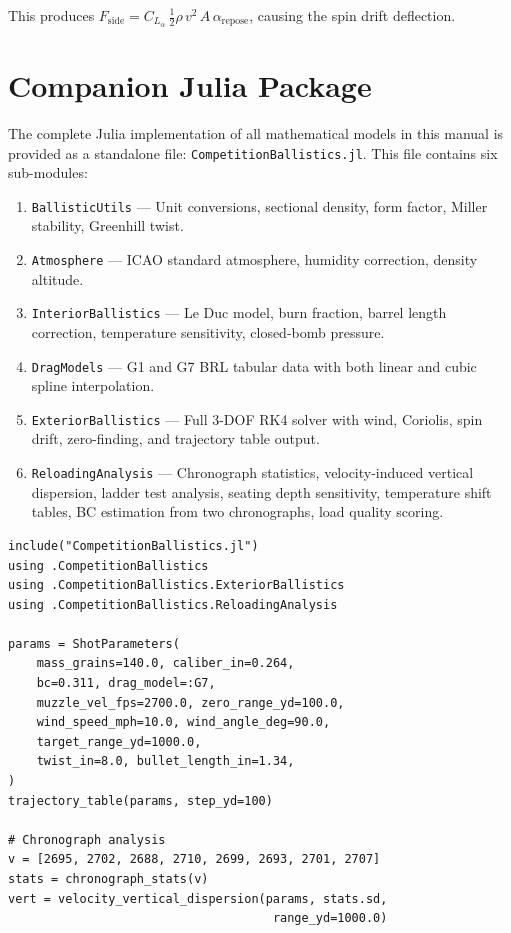\documentclass[11pt,twoside,openright]{report}
\begin{document}
This produces $F_{\mathrm{side}} = C_{L_\alpha}\,\frac{1}{2}\rho\,v^2\,A\,\alpha_{\mathrm{repose}}$, causing the spin drift deflection.


\chapter{Companion Julia Package}
\label{app:julia_file}

The complete Julia implementation of all mathematical models in this manual is provided as a standalone file: \texttt{CompetitionBallistics.jl}. This file contains six sub-modules:

\begin{enumerate}[nosep]
  \item \texttt{BallisticUtils} --- Unit conversions, sectional density, form factor, Miller stability, Greenhill twist.
  \item \texttt{Atmosphere} --- ICAO standard atmosphere, humidity correction, density altitude.
  \item \texttt{InteriorBallistics} --- Le Duc model, burn fraction, barrel length correction, temperature sensitivity, closed-bomb pressure.
  \item \texttt{DragModels} --- G1 and G7 BRL tabular data with both linear and cubic spline interpolation.
  \item \texttt{ExteriorBallistics} --- Full 3-DOF RK4 solver with wind, Coriolis, spin drift, zero-finding, and trajectory table output.
  \item \texttt{ReloadingAnalysis} --- Chronograph statistics, velocity-induced vertical dispersion, ladder test analysis, seating depth sensitivity, temperature shift tables, BC estimation from two chronographs, load quality scoring.
\end{enumerate}

\begin{lstlisting}[caption={Quick-start usage of CompetitionBallistics.jl},label={lst:quickstart}]
include("CompetitionBallistics.jl")
using .CompetitionBallistics
using .CompetitionBallistics.ExteriorBallistics
using .CompetitionBallistics.ReloadingAnalysis

params = ShotParameters(
    mass_grains=140.0, caliber_in=0.264,
    bc=0.311, drag_model=:G7,
    muzzle_vel_fps=2700.0, zero_range_yd=100.0,
    wind_speed_mph=10.0, wind_angle_deg=90.0,
    target_range_yd=1000.0,
    twist_in=8.0, bullet_length_in=1.34,
)
trajectory_table(params, step_yd=100)

# Chronograph analysis
v = [2695, 2702, 2688, 2710, 2699, 2693, 2701, 2707]
stats = chronograph_stats(v)
vert = velocity_vertical_dispersion(params, stats.sd,
                                     range_yd=1000.0)
\end{lstlisting}
\end{document}
